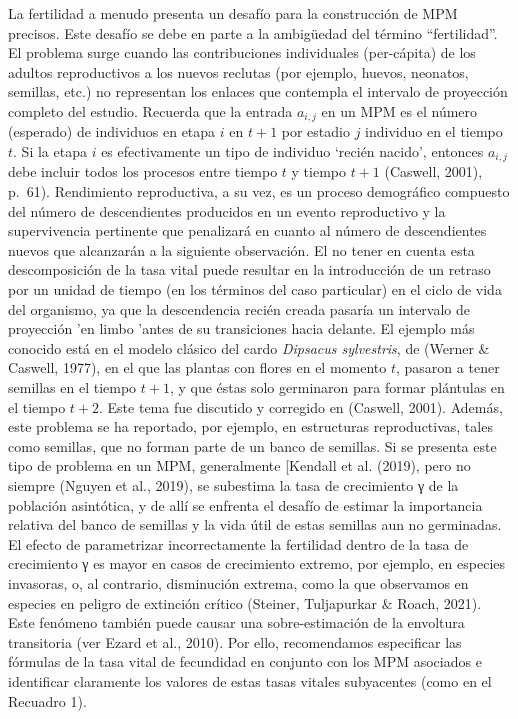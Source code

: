 \documentclass[
  12pt,
  letterpaper,
]{book}
\begin{document}
La fertilidad a menudo presenta un desafío para la construcción de MPM
precisos. Este desafío se debe en parte a la ambigüedad del término
``fertilidad''. El problema surge cuando las contribuciones individuales
(per-cápita) de los adultos reproductivos a los nuevos reclutas (por
ejemplo, huevos, neonatos, semillas, etc.) no representan los enlaces
que contempla el intervalo de proyección completo del estudio. Recuerda
que la entrada \(a_{i,j}\) en un MPM es el número (esperado) de
individuos en etapa \(i\) en \(t + 1\) por estadio \(j\) individuo en el
tiempo \(t\). Si la etapa \(i\) es efectivamente un tipo de individuo
`recién nacido', entonces \(a_{i,j}\) debe incluir todos los procesos
entre tiempo \(t\) y tiempo \(t + 1\) (Caswell, 2001), p.~61).
Rendimiento reproductiva, a su vez, es un proceso demográfico compuesto
del número de descendientes producidos en un evento reproductivo y la
supervivencia pertinente que penalizará en cuanto al número de
descendientes nuevos que alcanzarán a la siguiente observación. El no
tener en cuenta esta descomposición de la tasa vital puede resultar en
la introducción de un retraso por un unidad de tiempo (en los términos
del caso particular) en el ciclo de vida del organismo, ya que la
descendencia recién creada pasaría un intervalo de proyección 'en limbo
'antes de su transiciones hacia delante. El ejemplo más conocido está en
el modelo clásico del cardo \emph{Dipsacus sylvestris}, de (Werner \&
Caswell, 1977), en el que las plantas con flores en el momento \(t\),
pasaron a tener semillas en el tiempo \(t + 1\), y que éstas solo
germinaron para formar plántulas en el tiempo \(t + 2\). Este tema fue
discutido y corregido en (Caswell, 2001). Además, este problema se ha
reportado, por ejemplo, en estructuras reproductivas, tales como
semillas, que no forman parte de un banco de semillas. Si se presenta
este tipo de problema en un MPM, generalmente {[}Kendall et al. (2019),
pero no siempre (Nguyen et al., 2019), se subestima la tasa de
crecimiento γ de la población asintótica, y de allí se enfrenta el
desafío de estimar la importancia relativa del banco de semillas y la
vida útil de estas semillas aun no germinadas. El efecto de parametrizar
incorrectamente la fertilidad dentro de la tasa de crecimiento γ es
mayor en casos de crecimiento extremo, por ejemplo, en especies
invasoras, o, al contrario, disminución extrema, como la que observamos
en especies en peligro de extinción crítico (Steiner, Tuljapurkar \&
Roach, 2021). Este fenómeno también puede causar una sobre-estimación de
la envoltura transitoria (ver Ezard et al., 2010). Por ello,
recomendamos especificar las fórmulas de la tasa vital de fecundidad en
conjunto con los MPM asociados e identificar claramente los valores de
estas tasas vitales subyacentes (como en el Recuadro 1).
\end{document}
